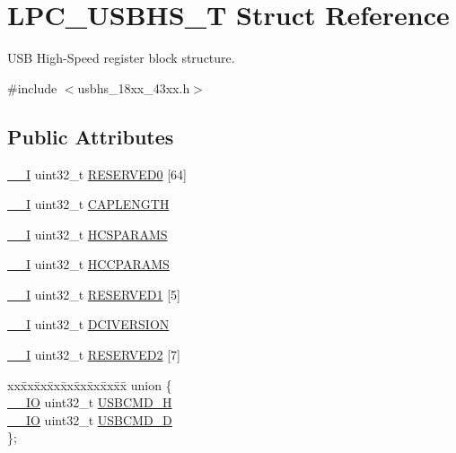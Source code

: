 \hypertarget{struct_l_p_c___u_s_b_h_s___t}{}\section{L\+P\+C\+\_\+\+U\+S\+B\+H\+S\+\_\+T Struct Reference}
\label{struct_l_p_c___u_s_b_h_s___t}


U\+SB High-\/\+Speed register block structure.  




{\ttfamily \#include $<$usbhs\+\_\+18xx\+\_\+43xx.\+h$>$}

\subsection*{Public Attributes}
\begin{DoxyCompactItemize}
\item 
\hyperlink{core__sc300_8h_af63697ed9952cc71e1225efe205f6cd3}{\+\_\+\+\_\+I} uint32\+\_\+t \hyperlink{struct_l_p_c___u_s_b_h_s___t_a6a092b621164b742aa31b70bafdc9c94}{R\+E\+S\+E\+R\+V\+E\+D0} \mbox{[}64\mbox{]}
\item 
\hyperlink{core__sc300_8h_af63697ed9952cc71e1225efe205f6cd3}{\+\_\+\+\_\+I} uint32\+\_\+t \hyperlink{struct_l_p_c___u_s_b_h_s___t_aa59ea2b2b4da221ded8bc9fccefa1348}{C\+A\+P\+L\+E\+N\+G\+TH}
\item 
\hyperlink{core__sc300_8h_af63697ed9952cc71e1225efe205f6cd3}{\+\_\+\+\_\+I} uint32\+\_\+t \hyperlink{struct_l_p_c___u_s_b_h_s___t_ae09874c8039d5b773c55b90d4b55c4a1}{H\+C\+S\+P\+A\+R\+A\+MS}
\item 
\hyperlink{core__sc300_8h_af63697ed9952cc71e1225efe205f6cd3}{\+\_\+\+\_\+I} uint32\+\_\+t \hyperlink{struct_l_p_c___u_s_b_h_s___t_a2e1277628f3492ab78f9a1e3753824d3}{H\+C\+C\+P\+A\+R\+A\+MS}
\item 
\hyperlink{core__sc300_8h_af63697ed9952cc71e1225efe205f6cd3}{\+\_\+\+\_\+I} uint32\+\_\+t \hyperlink{struct_l_p_c___u_s_b_h_s___t_a011d6477c5a68b461c971bfe45d34055}{R\+E\+S\+E\+R\+V\+E\+D1} \mbox{[}5\mbox{]}
\item 
\hyperlink{core__sc300_8h_af63697ed9952cc71e1225efe205f6cd3}{\+\_\+\+\_\+I} uint32\+\_\+t \hyperlink{struct_l_p_c___u_s_b_h_s___t_ae7a83cf1a1165226a30b4b09bb96a17e}{D\+C\+I\+V\+E\+R\+S\+I\+ON}
\item 
\hyperlink{core__sc300_8h_af63697ed9952cc71e1225efe205f6cd3}{\+\_\+\+\_\+I} uint32\+\_\+t \hyperlink{struct_l_p_c___u_s_b_h_s___t_a80d0a0d3a3d79b526cdfac9b43f14624}{R\+E\+S\+E\+R\+V\+E\+D2} \mbox{[}7\mbox{]}
\item 
\begin{tabbing}
xx\=xx\=xx\=xx\=xx\=xx\=xx\=xx\=xx\=\kill
union \{\\
\>\hyperlink{core__sc300_8h_aec43007d9998a0a0e01faede4133d6be}{\_\_IO} uint32\_t \hyperlink{struct_l_p_c___u_s_b_h_s___t_a61f328a3a9343dc23f054b2a834123db}{USBCMD\_H}\\
\>\hyperlink{core__sc300_8h_aec43007d9998a0a0e01faede4133d6be}{\_\_IO} uint32\_t \hyperlink{struct_l_p_c___u_s_b_h_s___t_ab9d77b4d7d76a6cb48f615dfa91bf9c2}{USBCMD\_D}\\
\}; \\


\end{tabbing}
\end{DoxyCompactItemize}
